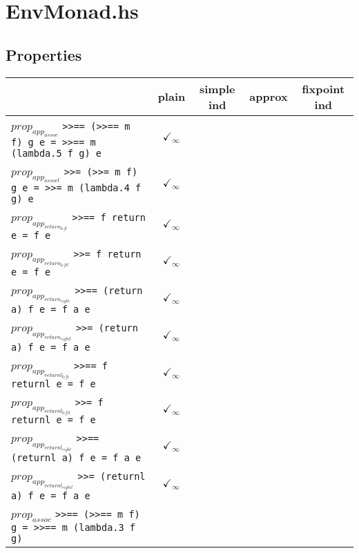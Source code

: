 \documentclass{article}
\begin{document}
\section*{EnvMonad.hs}
\subsection*{Properties}
\begin{longtable}{p{10cm} || c | c | c | c | }
  & plain & simple ind & approx & fixpoint ind \\
\hline
$prop_{app_{assoc}}$ \newline \verb`>>== (>>== m f) g e = >>== m (lambda.5 f g) e` & $\checkmark_{\infty}$ &  &  &  \\
\hline
$prop_{app_{assocl}}$ \newline \verb`>>= (>>= m f) g e = >>= m (lambda.4 f g) e` & $\checkmark_{\infty}$ &  &  &  \\
\hline
$prop_{app_{return_{left}}}$ \newline \verb`>>== f return e = f e` & $\checkmark_{\infty}$ &  &  &  \\
\hline
$prop_{app_{return_{leftl}}}$ \newline \verb`>>= f return e = f e` & $\checkmark_{\infty}$ &  &  &  \\
\hline
$prop_{app_{return_{right}}}$ \newline \verb`>>== (return a) f e = f a e` & $\checkmark_{\infty}$ &  &  &  \\
\hline
$prop_{app_{return_{rightl}}}$ \newline \verb`>>= (return a) f e = f a e` & $\checkmark_{\infty}$ &  &  &  \\
\hline
$prop_{app_{returnl_{left}}}$ \newline \verb`>>== f returnl e = f e` & $\checkmark_{\infty}$ &  &  &  \\
\hline
$prop_{app_{returnl_{leftl}}}$ \newline \verb`>>= f returnl e = f e` & $\checkmark_{\infty}$ &  &  &  \\
\hline
$prop_{app_{returnl_{right}}}$ \newline \verb`>>== (returnl a) f e = f a e` & $\checkmark_{\infty}$ &  &  &  \\
\hline
$prop_{app_{returnl_{rightl}}}$ \newline \verb`>>= (returnl a) f e = f a e` & $\checkmark_{\infty}$ &  &  &  \\
\hline
$prop_{assoc}$ \newline \verb`>>== (>>== m f) g = >>== m (lambda.3 f g)` &  &  &  &  \\

\end{longtable}
\end{document}
